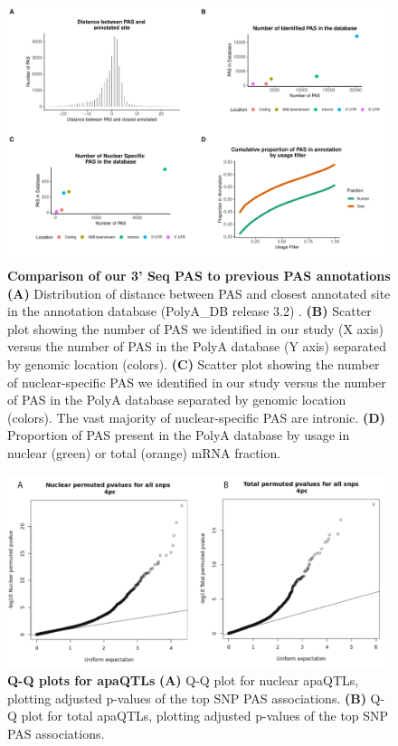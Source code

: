 \begin{figure}[!htb]
\centering \includegraphics[width=5in]{img/ch02/Fig1_figuresupplement6.pdf}
\caption[Comparison of our 3'-Seq PAS to previous PAS annotations]{\textbf{Comparison of our 3' Seq PAS to previous PAS annotations} {\bf (A)} Distribution of distance between PAS and closest annotated site in the annotation database (PolyA\_DB release 3.2) \citep{wang_polya_db_2018}. {\bf (B)} Scatter plot showing the number of PAS we identified in our study (X axis) versus the number of PAS in the PolyA database (Y axis) separated by genomic location (colors). {\bf (C)} Scatter plot showing the number of nuclear-specific PAS we identified in our study versus the number of PAS in the PolyA database separated by genomic location (colors). The vast majority of nuclear-specific PAS are intronic. {\bf (D)} Proportion of PAS present in the PolyA database by usage in nuclear (green) or total (orange) mRNA fraction.}
\label{fig:compAnno}
\end{figure}
\clearpage


\begin{figure}[!htb]
\centering \includegraphics[width=5in]{img/ch02/Fig2_figuresupplement1.pdf}
\caption[Q-Q plots for apaQTLs]{\textbf{Q-Q plots for apaQTLs} {\bf (A)} Q-Q plot for nuclear apaQTLs, plotting adjusted p-values of the top SNP PAS associations. {\bf (B)} Q-Q plot for total apaQTLs, plotting adjusted p-values of the top SNP PAS associations.}
\label{fig:QQplots}
\end{figure}
\clearpage

